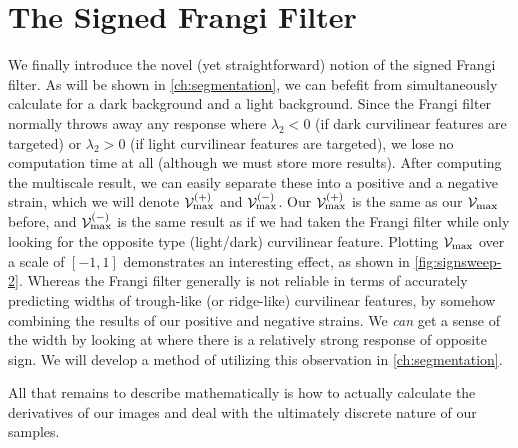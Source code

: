 \section{The Signed Frangi Filter} \label{sec:signed-frangi-filter}
We finally introduce the novel (yet straightforward) notion of the signed Frangi filter. As will be shown in \cref{ch:segmentation}, we can befefit from simultaneously calculate for a dark background and a light background. Since the Frangi filter normally throws away any response where $\lambda_2 < 0$ (if dark curvilinear features are targeted) or $\lambda_2 >0$ (if light curvilinear features are targeted), we lose no computation time at all (although we must store more results). After computing the multiscale result, we can easily separate these into a positive and a negative strain, which we will denote
$\mathcal{V}_{\max}^{(+)}$ and $\mathcal{V}_{\max}^{(-)}$. Our $\mathcal{V}_{\max}^{(+)}$ is the same as our $\mathcal{V}_{\max}$ before, and $\mathcal{V}_{\max}^{(-)}$ is the same result as if we had taken the Frangi filter while only looking for the opposite type (light/dark) curvilinear feature. Plotting $\mathcal{V}_{\max}$ over a scale of $[-1,1]$ demonstrates an interesting effect, as shown in \cref{fig:signsweep-2}. Whereas the Frangi filter generally is not reliable in terms of accurately predicting widths of trough-like (or ridge-like) curvilinear features, by somehow combining the results of our positive and negative strains. We \textit{can} get a sense of the width by looking at where there is a relatively strong response of opposite sign. We will develop a method of utilizing this observation in \cref{ch:segmentation}.


All that remains to describe mathematically is how to actually calculate the derivatives of our images and deal with the ultimately discrete nature of our samples.    